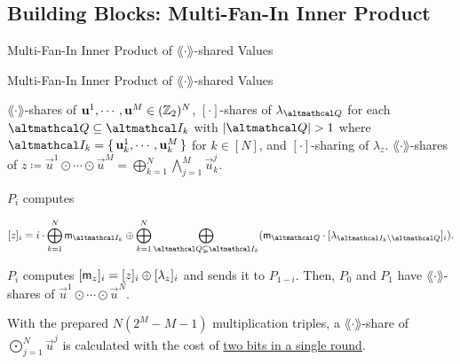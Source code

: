 \documentclass[../240906_cryptlab_flute.tex]{subfiles}
\begin{document}
\subsection{Building Blocks: Multi-Fan-In Inner Product}
\begin{frame}{Multi-Fan-In Inner Product of \(\lang\cdot\rang\)-shared Values}
    \begin{block}{Multi-Fan-In Inner Product of \(\lang\cdot\rang\)-shared Values}
        \begin{description}[Output]
            \ii[Input]
            \(\lang\cdot\rang\)-shares of \(\boldsymbol{\mathbf{u}}^1, \cdots, \boldsymbol{\mathbf{u}}^M \in (\mathbb{Z}_2)^N\),
            \([\cdot]\)-shares of \(\lambda_{\mcal{Q}}\) for each \(\mcal{Q} \subseteq \mcal{I}_k\)
            with \(|\mcal{Q}| > 1\) where \(\mcal{I}_k = \{\,\vec{u}^1_k,\cdots,\vec{u}^M_k\,\}\)
            for \(k \in [N]\),
            and \([\cdot]\)-sharing of \(\lambda_z\).
            \ii[Output]
            \(\lang\cdot\rang\)-shares of
            \(z \coloneqq \vec{u}^1 \odot \cdots \odot \vec{u}^M = \bigoplus_{k=1}^N \bigwedge_{j=1}^M \vec{u}^j_k\).
        \end{description}
        \pause
        \begin{enumerate}
            \ii
            \(P_i\) computes
            \centerline{\(\displaystyle
                [z]_i = i \cdot \bigoplus_{k=1}^N \msf{m}_{\mcal{I}_k}
                \oplus \bigoplus_{k=1}^N \bigoplus_{\mcal{Q} \subsetneq \mcal{I}_k} (\msf{m}_{\mcal{Q}}
                \cdot [\lambda_{\mcal{I}_k \setminus \mcal{Q}}]_i).
            \)}
            \pause
            \ii
            \(P_i\) computes \([\mathsf{m}_z]_i = [z]_i \oplus [\lambda_z]_i\)
            and sends it to \(P_{1-i}\).
            \ii
            Then, \(P_0\) and \(P_1\) have \(\lang\cdot\rang\)-shares of \(\vec{u}^1 \odot \cdots \odot \vec{u}^N\).
        \end{enumerate}
        \pause
        With the prepared \(N(2^M - M - 1)\) multiplication triples,
        a \(\lang\cdot\rang\)-share of \(\bigodot_{j=1}^N \vec{u}^j\)
        is calculated with the cost of \ul{two bits in a single round}.
    \end{block}
\end{frame}
\end{document}
